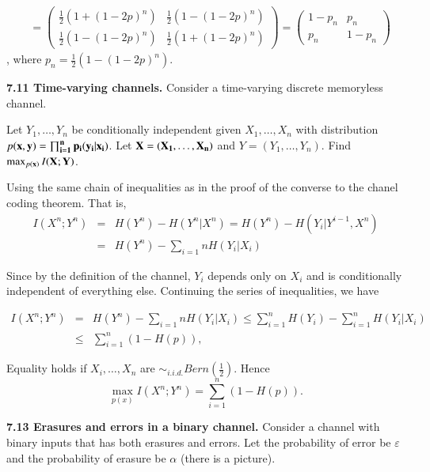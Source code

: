 \documentclass[10pt]{article}
\begin{document}
\begin{tiny}
\begin{multicols}{3}
\begin{align*}
&= \begin{pmatrix}
        \frac{1}{2}(1 + (1-2p)^n) & \frac{1}{2}(1 - (1-2p)^n) \\
        \frac{1}{2}(1 - (1-2p)^n) & \frac{1}{2}(1 + (1-2p)^n) \end{pmatrix}
    = \begin{pmatrix} 1 - p_n & p_n \\
        p_n & 1 - p_n \end{pmatrix} 
\end{align*} , where  $p_n = \frac{1}{2}(1 - (1-2p)^n)$.

\textbf{\scriptsize 7.11 Time-varying channels.}
Consider a time-varying discrete memoryless channel.

Let $Y_1,\dots,Y_n$ be conditionally independent given $X_1,\dots,X_n$ with distribution $p(\bf{x}, \bf{y}) = \prod_{i=1}^{n}p_i(y_i|x_i)$. Let $\bf{X} = (X_1,\dots,X_n)$ and $Y=(Y_1,\dots,Y_n)$. Find $\max_{p(\bf{x})} I(\bf{X};\bf{Y})$.

Using the same chain of inequalities as in the proof of the converse to the chanel coding theorem. That is,
\begin{eqnarray*}
    I(X^n;Y^n) &=& H(Y^n) - H(Y^n|X^n)  = H(Y^n) - H(Y_i | Y^{i-1}, X^n)  \\
        &=& H(Y^n) - \sum_{i=1}{n} H(Y_i | X_i)
\end{eqnarray*}

Since by the definition of the channel, $Y_i$ depends only on $X_i$ and is conditionally independent of everything else. Continuing the series of inequalities, we have

\begin{eqnarray*}
    I(X^n;Y^n) &=& H(Y^n) - \sum_{i=1}{n} H(Y_i | X_i) 
    \le \sum_{i=1}^{n} H(Y_i) - \sum_{i=1}^{n}H(Y_i | X_i) \\ 
    &\le& \sum_{i=1}^{n} (1-H(p)),
\end{eqnarray*}

Equality holds if $X_i,\dots,X_n$ are $\sim_{i.i.d.} Bern(\frac{1}{2})$. Hence
\begin{equation*}
    \max_{p(x)} I(X^n; Y^n) = \sum_{i=1}^{n}(1-H(p)).
\end{equation*}

\textbf{\scriptsize 7.13 Erasures and errors in a binary channel.}
Consider a channel with binary inputs that has both erasures and errors. Let the probability of error be $\varepsilon$ and the probability of erasure be $\alpha$ (there is a picture).


\end{multicols}
\end{tiny}
\end{document}
